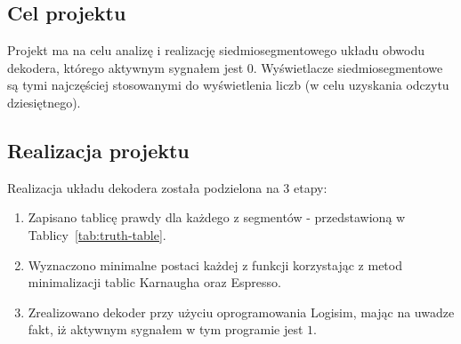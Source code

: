 \subsection{Cel projektu}\label{subsec:intro-goal}
Projekt ma na celu analizę i realizację siedmiosegmentowego układu obwodu dekodera, którego aktywnym sygnałem jest $0$.
Wyświetlacze siedmiosegmentowe są tymi najczęściej stosowanymi do
wyświetlenia liczb (w celu uzyskania odczytu dziesiętnego).

\subsection{Realizacja projektu}\label{subsec:intro-how}
Realizacja układu dekodera została podzielona na 3 etapy:
\begin{enumerate}
    \item Zapisano tablicę prawdy dla każdego z segmentów - przedstawioną w Tablicy~\ref{tab:truth-table}.
    \item Wyznaczono minimalne postaci każdej z funkcji korzystając
          z metod minimalizacji tablic Karnaugha oraz Espresso.
    \item Zrealizowano dekoder przy użyciu oprogramowania Logisim, mając na uwadze fakt,
          iż aktywnym sygnałem w tym programie jest $1$.
\end{enumerate}

